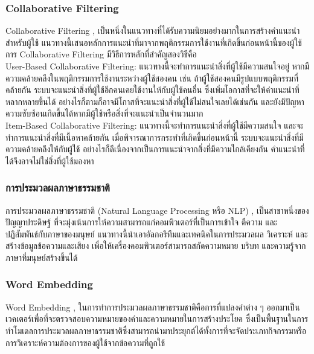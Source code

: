 \documentclass[14pt,oneside,openright,a4paper]{cpe-thai-project}
\begin{document}
    \subsubsection {Collaborative Filtering}
  Collaborative Filtering \cite{Item-Based}, \cite{Content-Boosted} เป็นหนึ่งในแนวทางที่ได้รับความนิยมอย่างมากในการสร้างคำแนะนำสำหรับผู้ใช้ แนวทางนี้เสนอหลักการแนะนำที่มาจากพฤติกรรมการใช้งานที่เกิดขึ้นก่อนหน้านี้ของผู้ใช้ 
  การ Collaborative Filtering มีวิธีการหลักที่สำคัญสองวิธีคือ \\
  User-Based Collaborative Filtering: แนวทางนี้จะทำการแนะนำสิ่งที่ผู้ใช้มีความสนใจอยู่ หากมีความคล้ายคลึงในพฤติกรรมการใช้งานระหว่างผู้ใช้สองคน 
  เช่น ถ้าผู้ใช้สองคนมีรูปแบบพฤติกรรมที่คล้ายกัน ระบบจะแนะนำสิ่งที่ผู้ใช้อีกคนเคยใช้งานให้กับผู้ใช้คนอื่น ซึ่งเพิ่มโอกาสที่จะให้คำแนะนำที่หลากหลายขึ้นได้ 
  อย่างไรก็ตามก็อาจมีโกาสที่จะแนะนำสิ่งที่ผู้ใช้ไม่สนใจเลยได้เช่นกัน และยังมีปัญหาความซับซ้อนเกิดขึ้นได้หากมีผู้ใช้หรือสิ่งที่จะแนะนำเป็นจำนวนมาก \\
  Item-Based Collaborative Filtering: แนวทางนี้จะทำการแนะนำสิ่งที่ผู้ใช้มีความสนใจ และจะทำการแนะนำสิ่งที่มีเนื้อหาคล้ายกัน เมื่อพิจารณาการกระทำที่เกิดขึ้นก่อนหน้านี้ 
  ระบบจะแนะนำสิ่งที่มีความคล้ายคลึงให้กับผู้ใช้ อย่างไรก็ดีเนื่องจากเป็นการแนะนำจากสิ่งที่มีความใกล้เคียงกัน คำแนะนำที่ได้จึงอาจไม่ใช่สิ่งที่ผู้ใช้มองหา \\
\subsubsection {การประมวลผลภาษาธรรมชาติ}
การประมวลผลภาษาธรรมชาติ (Natural Language Processing หรือ NLP) \cite{recommendation}, \cite{NLPforContentbase} เป็นสาขาหนึ่งของปัญญาประดิษฐ์ ที่จะมุ่งเน้นการให้ความสามารถแก่คอมพิวเตอร์ที่เป็นการเข้าใจ ตีความ และปฏิสัมพันธ์กับภาษาของมนุษย์ 
แนวทางนี้นำเอาอัลกอริทึมและเทคนิคในการประมวลผล วิเคราะห์ และสร้างข้อมูลข้อความและเสียง เพื่อให้เครื่องคอมพิวเตอร์สามารถสกัดความหมาย บริบท และความรู้จากภาษาที่มนุษย์สร้างขึ้นได้ \\
  \subsubsection {Word Embedding}
	 Word Embedding \cite{WordEmbedding}, \cite{WordEmbeddingForCollaborative} ในการทำการประมวลผลภาษาธรรมชาติคือการที่แปลงคำต่าง ๆ ออกมาเป็นเวคเตอร์เพื่อที่จะตรวจสอบความหมายของคำและความหมายในการสร้างประโยค 
   ซึ่งเป็นพื้นฐานในการทำโมเดลการประมวลผลภาษาธรรมชาติซึ่งสามารถนำมาประยุกต์ได้ทั้งการที่จะจัดประเภทกิจกรรมหรือการวิเคราะห์ความต้องการของผู้ใช้จากข้อความที่ถูกใช้ \\
\end{document}
